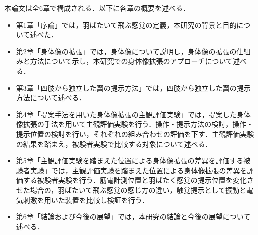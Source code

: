         本論文は全6章で構成される．以下に各章の概要を述べる．

        \begin{itemize}
                \item 第1章「序論」では，羽ばたいて飛ぶ感覚の定義，本研究の背景と目的について述べた．
                
                \item 第2章「身体像の拡張」では，身体像について説明し，身体像の拡張の仕組みと方法について示し，本研究での身体像拡張のアプローチについて述べる．
                
                \item 第3章「四肢から独立した翼の提示方法」では，四肢から独立した翼の提示方法について述べる．
                
                \item 第4章「提案手法を用いた身体像拡張の主観評価実験」では，提案した身体像拡張の手法を用いて主観評価実験を行う．操作・提示方法の検討，操作・提示位置の検討を行い，それぞれの組み合わせの評価を下す．主観評価実験の結果を踏まえ，被験者実験で比較する対象について述べる．
                
                \item 第5章「主観評価実験を踏まえた位置による身体像拡張の差異を評価する被験者実験」では，主観評価実験を踏まえた位置による身体像拡張の差異を評価する被験者実験を行う．筋電計測位置と羽ばたく感覚の提示位置を変化させた場合の，羽ばたいて飛ぶ感覚の感じ方の違い，触覚提示として振動と電気刺激を用いた装置を比較し検証を行う．
                
                \item 第6章「結論および今後の展望」では，本研究の結論と今後の展望について述べる．
        \end{itemize}
        
        


        
